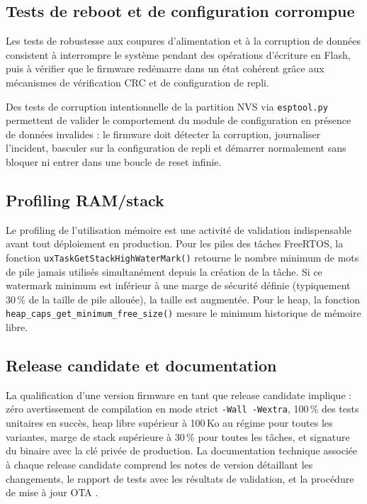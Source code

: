 \subsection{Tests de reboot et de configuration corrompue}
\label{subsec:reboot_tests}

Les tests de robustesse aux coupures d'alimentation et à la corruption
de données consistent à interrompre le système pendant des opérations
d'écriture en Flash, puis à vérifier que le firmware redémarre dans
un état cohérent grâce aux mécanismes de vérification CRC et de
configuration de repli.

Des tests de corruption intentionnelle de la partition NVS via
\texttt{esptool.py} permettent de valider le comportement du module
de configuration en présence de données invalides : le firmware doit
détecter la corruption, journaliser l'incident, basculer sur la
configuration de repli et démarrer normalement sans bloquer ni entrer
dans une boucle de reset infinie.

\subsection{Profiling RAM/stack}
\label{subsec:profiling}

Le profiling de l'utilisation mémoire est une activité de validation
indispensable avant tout déploiement en production. Pour les piles
des tâches FreeRTOS, la fonction
\texttt{uxTaskGetStackHighWaterMark()} retourne le nombre minimum
de mots de pile jamais utilisés simultanément depuis la création de
la tâche. Si ce watermark minimum est inférieur à une marge de
sécurité définie (typiquement 30\,\% de la taille de pile allouée),
la taille est augmentée. Pour le heap, la fonction
\texttt{heap\_caps\_get\_minimum\_free\_size()} mesure le minimum
historique de mémoire libre.

\subsection{Release candidate et documentation}
\label{subsec:release}

La qualification d'une version firmware en tant que release candidate
implique : zéro avertissement de compilation en mode strict
\texttt{-Wall -Wextra}, 100\,\% des tests unitaires en succès,
heap libre supérieur à 100\,Ko au régime pour toutes les variantes,
marge de stack supérieure à 30\,\% pour toutes les tâches, et
signature du binaire avec la clé privée de production. La
documentation technique associée à chaque release candidate comprend
les notes de version détaillant les changements, le rapport de tests
avec les résultats de validation, et la procédure de mise à jour OTA
\cite{unity_testing}.

